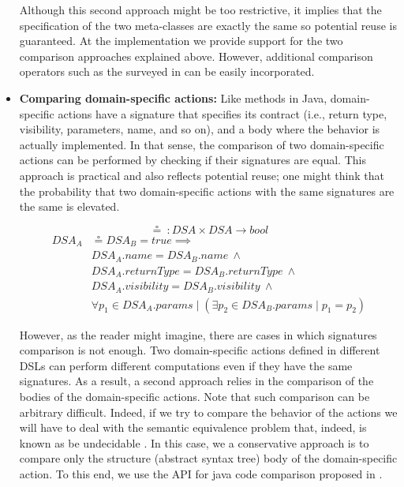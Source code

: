 \begin{itemize}
\vspace{2mm}
\hspace{3mm} Although this second approach might be too restrictive, it implies that the specification of the two meta-classes are exactly the same so potential reuse is guaranteed. At the implementation we provide support for the two comparison approaches explained above. However, additional comparison operators such as the surveyed in \cite{Lafi:2011} can be easily incorporated.

\vspace{2mm}

\item \textbf{Comparing domain-specific actions:} Like methods in Java, domain-specific actions have a signature that specifies its contract (i.e., return type, visibility, parameters, name, and so on), and a body where the behavior is actually implemented. In that sense, the comparison of two domain-specific actions can be performed by checking if their signatures are equal. This approach is practical and also reflects potential reuse; one might think that the probability that two domain-specific actions with the same signatures are the same is elevated.

\begin{equation}
  \circeq~: DSA \times DSA \rightarrow bool
\end{equation}
\vspace{-1mm}
\begin{equation}
\begin{split}
  DSA_{A} & \circeq DSA_{B} = true \implies \\
   & DSA_{A}.name = DSA_{B}.name ~ \wedge \\
   & DSA_{A}.returnType = DSA_{B}.returnType ~ \wedge \\
   & DSA_{A}.visibility = DSA_{B}.visibility ~ \wedge \\
   & \forall p_1 \in DSA_{A}.params \mid (\exists p_2 \in DSA_{B}.params \mid p_1 = p_2)
 \end{split}
\end{equation}

\vspace{2mm}
\hspace{3mm} However, as the reader might imagine, there are cases in which signatures comparison is not enough. Two domain-specific actions defined in different DSLs can perform different computations even if they have the same signatures. As a result, a second approach relies in the comparison of the bodies of the domain-specific actions. Note that such comparison can be arbitrary difficult. Indeed, if we try to compare  the behavior of the actions we will have to deal with the semantic equivalence problem that, indeed, is known as be undecidable \cite{Lucanu:2013}. In this case, we a conservative approach is to compare only the structure (abstract syntax tree) body of the domain-specific action. To this end, we use the API for java code comparison proposed in \cite{Biegel:2010}. 


\end{itemize}

